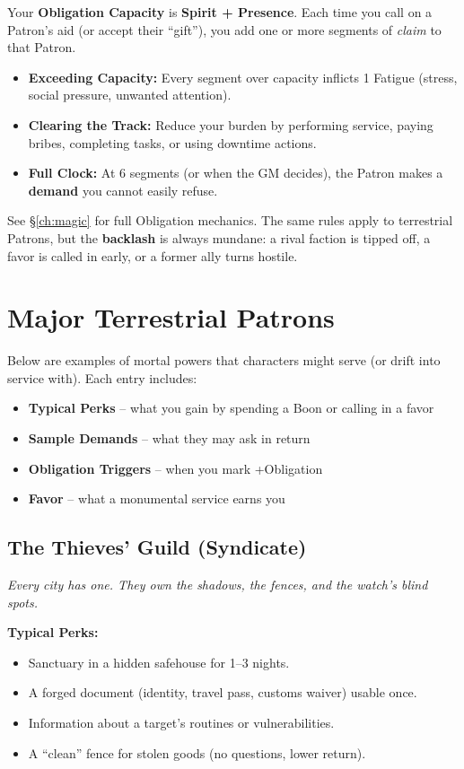 Your \textbf{Obligation Capacity} is \textbf{Spirit + Presence}. Each time you call on a Patron’s aid (or accept their “gift”), you add one or more segments of \textit{claim} to that Patron.

\begin{itemize}
  \item \textbf{Exceeding Capacity:} Every segment over capacity inflicts 1 Fatigue (stress, social pressure, unwanted attention).
  \item \textbf{Clearing the Track:} Reduce your burden by performing service, paying bribes, completing tasks, or using downtime actions.
  \item \textbf{Full Clock:} At 6 segments (or when the GM decides), the Patron makes a \textbf{demand} you cannot easily refuse.
\end{itemize}

See \S\ref{ch:magic} for full Obligation mechanics. The same rules apply to terrestrial Patrons, but the \textbf{backlash} is always mundane: a rival faction is tipped off, a favor is called in early, or a former ally turns hostile.

\section{Major Terrestrial Patrons}

Below are examples of mortal powers that characters might serve (or drift into service with). Each entry includes:
\begin{itemize}
  \item \textbf{Typical Perks} – what you gain by spending a Boon or calling in a favor
  \item \textbf{Sample Demands} – what they may ask in return
  \item \textbf{Obligation Triggers} – when you mark +Obligation
  \item \textbf{Favor} – what a monumental service earns you
\end{itemize}

\subsection{The Thieves’ Guild (Syndicate)}

\textit{Every city has one. They own the shadows, the fences, and the watch’s blind spots.}

\textbf{Typical Perks:}
\begin{itemize}
  \item Sanctuary in a hidden safehouse for 1–3 nights.
  \item A forged document (identity, travel pass, customs waiver) usable once.
  \item Information about a target’s routines or vulnerabilities.
  \item A “clean” fence for stolen goods (no questions, lower return).
\end{itemize}

